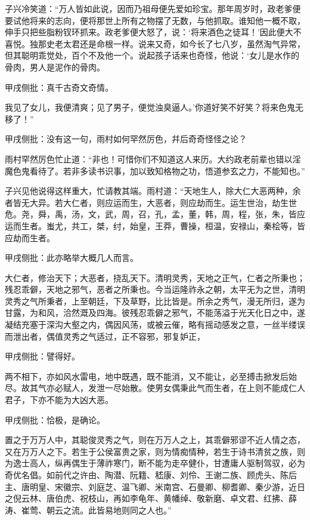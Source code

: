 \begin{parag}
    子兴冷笑道：“万人皆如此说，因而乃祖母便先爱如珍宝。那年周岁时，政老爹便要试他将来的志向，便将那世上所有之物摆了无数，与他抓取。谁知他一概不取，伸手只把些脂粉钗环抓来。政老爹便大怒了，说：‘将来酒色之徒耳！’因此便大不喜悦。独那史老太君还是命根一样。说来又奇，如今长了七八岁，虽然淘气异常，但其聪明乖觉处，百个不及他一个。说起孩子话来也奇怪，他说：‘女儿是水作的骨肉，男人是泥作的骨肉。\begin{note}甲戌侧批：真千古奇文奇情。\end{note}我见了女儿，我便清爽；见了男子，便觉浊臭逼人。’你道好笑不好笑？将来色鬼无移了！”\begin{note}甲戌侧批：没有这一句，雨村如何罕然厉色，幷后奇奇怪怪之论？\end{note}雨村罕然厉色忙止道：“非也！可惜你们不知道这人来历。大约政老前辈也错以淫魔色鬼看待了。若非多读书识事，加以致知格物之功，悟道参玄之力，不能知也。”
\end{parag}


\begin{parag}
    子兴见他说得这样重大，忙请教其端。雨村道：“天地生人，除大仁大恶两种，余者皆无大异。若大仁者，则应运而生，大恶者，则应劫而生。运生世治，劫生世危。尧，舜，禹，汤，文，武，周，召，孔，孟，董，韩，周，程，张，朱，皆应运而生者。蚩尤，共工，桀，纣，始皇，王莽，曹操，桓温，安禄山，秦桧等，皆应劫而生者。\begin{note}甲戌侧批：此亦略举大概几人而言。\end{note}大仁者，修治天下；大恶者，挠乱天下。清明灵秀，天地之正气，仁者之所秉也；残忍乖僻，天地之邪气，恶者之所秉也。今当运隆祚永之朝，太平无为之世，清明灵秀之气所秉者，上至朝廷，下及草野，比比皆是。所余之秀气，漫无所归，遂为甘露，为和风，洽然溉及四海。彼残忍乖僻之邪气，不能荡溢于光天化日之中，遂凝结充塞于深沟大壑之内，偶因风荡，或被云催，略有摇动感发之意，一丝半缕误而泄出者，偶值灵秀之气适过，正不容邪，邪复妒正，\begin{note}甲戌侧批：譬得好。\end{note}两不相下，亦如风水雷电，地中既遇，既不能消，又不能让，必至搏击掀发后始尽。故其气亦必赋人，发泄一尽始散。使男女偶秉此气而生者，在上则不能成仁人君子，下亦不能为大凶大恶。\begin{note}甲戌侧批：恰极，是确论。\end{note}置之于万万人中，其聪俊灵秀之气，则在万万人之上，其乖僻邪谬不近人情之态，又在万万人之下。若生于公侯富贵之家，则为情痴情种，若生于诗书清贫之族，则为逸士高人，纵再偶生于薄祚寒门，断不能为走卒健仆，甘遭庸人驱制驾驭，必为奇优名倡。如前代之许由、陶潜、阮籍、嵇康、刘伶、王谢二族、顾虎头、陈后主、唐明皇、宋徽宗、刘庭芝、温飞卿、米南宫、石曼卿、柳耆卿、秦少游，近日之倪云林、唐伯虎、祝枝山，再如李龟年、黄幡绰、敬新磨、卓文君、红拂、薛涛、崔莺、朝云之流。此皆易地则同之人也。”
\end{parag}


